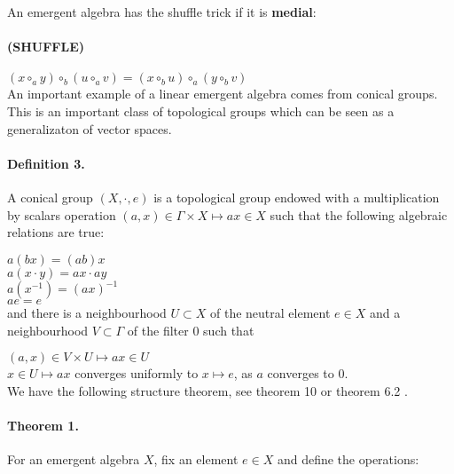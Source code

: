 \documentclass{article}
\begin{document}
\noindent An emergent algebra has the shuffle trick if it is {\bf medial}: \\

\paragraph{(SHUFFLE)} $\displaystyle (x \circ_{a} y) \circ_{b} (u \circ_{a} v) = (x \circ_{b} u) \circ_{a} (y \circ_{b} v)$ \\


An important example of a linear emergent algebra comes from conical groups. This is an important class of topological groups which can be seen as a generalizaton of vector spaces. 

\paragraph{Definition 3.} A conical group $\displaystyle (X,\cdot,e)$  is a topological group endowed with a multiplication by scalars operation $\displaystyle (a,x) \in \Gamma \times X \mapsto ax \in X$ such that the following algebraic relations are true: 

$\displaystyle  a (b x) = (ab) x$ \\

$\displaystyle  a (x \cdot y) = ax \cdot ay$ \\ 

$\displaystyle  a (x^{-1}) = ( ax)^{-1}$ \\

$ a e = e $\\
and there is a neighbourhood $U \subset X$ of the neutral element $e \in X$ and a neighbourhood $V \subset \Gamma$ of the filter $0$ such that 

$\displaystyle (a,x) \in V \times U \mapsto ax \in U$\\

$\displaystyle x  \in U \mapsto ax$ converges uniformly to $\displaystyle x \mapsto e$, as $a$ converges to $0$. \\



We have the following structure theorem, see theorem 10 \cite{buligadil1} or theorem 6.2 \cite{buligaem}. \\

\paragraph{Theorem 1.} For an emergent algebra $X$, fix an element $e \in X$ and define the operations: \\
\end{document}
